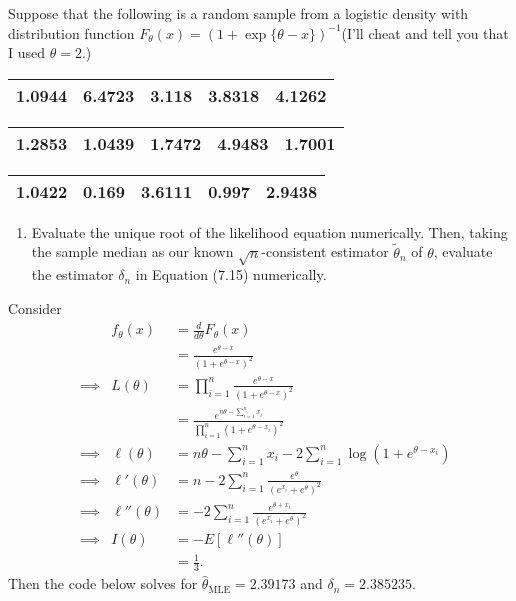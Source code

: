 \documentclass[12pt,]{article}
\providecommand{\tightlist}{%
  \setlength{\itemsep}{0pt}\setlength{\parskip}{0pt}}
\begin{document}
Suppose that the following is a random sample from a logistic density
with distribution function
\(F_\theta(x)=(1+\exp\{\theta-x\})^{-1}\)(I'll cheat and tell you that I
used \(\theta=2.\))

\begin{longtable}[]{@{}rrrrr@{}}
\toprule
\endhead
1.0944 & 6.4723 & 3.118 & 3.8318 & 4.1262\tabularnewline
\bottomrule
\end{longtable}

\begin{longtable}[]{@{}rrrrr@{}}
\toprule
\endhead
1.2853 & 1.0439 & 1.7472 & 4.9483 & 1.7001\tabularnewline
\bottomrule
\end{longtable}

\begin{longtable}[]{@{}rrrrr@{}}
\toprule
\endhead
1.0422 & 0.169 & 3.6111 & 0.997 & 2.9438\tabularnewline
\bottomrule
\end{longtable}

\begin{enumerate}
\def\labelenumi{(\alph{enumi})}
\tightlist
\item
  Evaluate the unique root of the likelihood equation numerically. Then,
  taking the sample median as our known \(\sqrt{n}\)-consistent
  estimator \(\tilde\theta_n\) of \(\theta\), evaluate the estimator
  \(\delta_n\) in Equation (7.15) numerically.
\end{enumerate}

Consider \begin{align*}
&&f_\theta(x)&=\frac{d}{d\theta}F_\theta(x)\\
&&&=\frac{e^{\theta-x}}{(1+e^{\theta-x})^2}\\
&\implies&L(\theta)&=\prod_{i=1}^n\frac{e^{\theta-x}}{(1+e^{\theta-x})^2}\\
&&&=\frac{e^{n\theta-\sum_{i=1}^nx_i}}{\prod_{i=1}^n(1+e^{\theta-x_i})^2}\\
&\implies&\ell(\theta)&=n\theta-\sum_{i=1}^n x_i-2\sum_{i=1}^n\log(1+e^{\theta-x_i})\\
&\implies&\ell'(\theta)&=n-2\sum_{i=1}^n\frac{e^\theta}{(e^{x_i}+e^\theta)^2}\\
&\implies&\ell''(\theta)&=-2\sum_{i=1}^n\frac{e^{\theta+x_i}}{(e^{x_i}+e^\theta)^2}\\
&\implies&I(\theta)&=-E[\ell''(\theta)]\\
&&&=\frac{1}{3}.
\end{align*} Then the code below solves for
\(\hat\theta_{\text{MLE}}=2.39173\) and \(\delta_n=2.385235.\)
\end{document}
